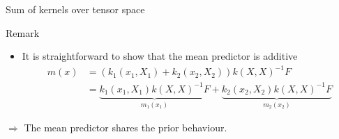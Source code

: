 \begin{frame}{Sum of kernels over tensor space}
\begin{block}{Remark}%
\begin{itemize}
\item It is straightforward to show that the mean predictor is additive
\begin{equation*}
\begin{split}
m(x) & = (k_1(x_1,X_1)+k_2(x_2,X_2)) k(X,X)^{-1} F \\
& = \underbrace{k_1(x_1,X_1) k(X,X)^{-1} F}_{m_1(x_1)} + \underbrace{k_2(x_2,X_2) k(X,X)^{-1} F}_{m_2(x_2)}
\end{split}
\end{equation*}
\end{itemize}
\end{block}
\vspace{5mm}
\begin{block}{}
\alert{ $\Rightarrow$ The mean predictor shares the prior behaviour.}
\end{block}
\vfill \
\vspace{2cm} \
\end{frame}

